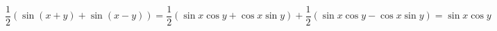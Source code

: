 \begin{dmath}\label{eq:trigonometric}
\frac12 (\sin(x+y) + \sin(x-y)) = \frac12(\sin x\cos y + \cos x\sin y)
+ \frac12(\sin x\cos y - \cos x\sin y) = \sin x\cos y
\end{dmath}
